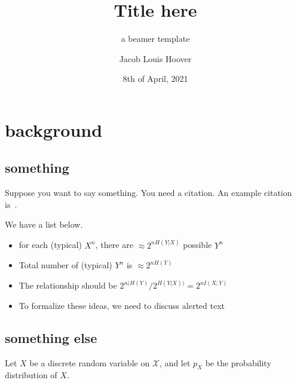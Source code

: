 \documentclass[10pt]{beamer}%
\title{Title here}
\subtitle{a beamer template}
\date{8th of April, 2021}
\author{Jacob Louis Hoover}
\begin{document}
{%
\maketitle
}

\section{background}
\subsection{something}

\begin{frame}
Suppose you want to say something. You need a citation.
An example citation is~\cite{billingsley.p:1995}.

\end{frame}

\begin{frame}

We have a list below.

\begin{itemize}
\item for each (typical) $X^n$, there are $\approx 2^{nH(Y|X)}$ possible $Y^n$
\item Total number of (typical) $Y^n$ is $\approx 2^{nH(Y)}$
\item The relationship should be $2^{n(H(Y)}/2^{H(Y|X))} = 2^{nI(X;Y )}$
\item To formalize these ideas, we need to discuss \alert{alerted text}
\end{itemize}
\end{frame}

\subsection{something else}
\begin{frame}
Let $X$ be a discrete random variable on $\mathcal{X}$, and let $p_X$ be the probability distribution of $X$.

\end{frame}
\end{document}
